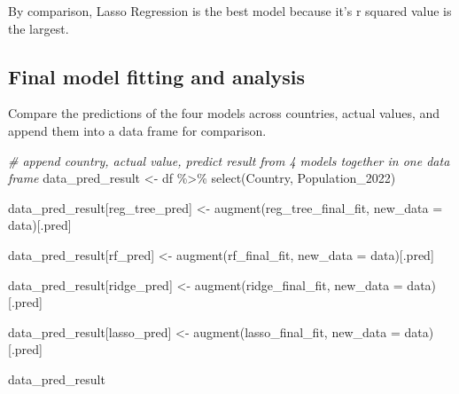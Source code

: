 \documentclass[
]{article}
\newenvironment{Shaded}{\begin{snugshade}}{\end{snugshade}}
\newcommand{\AttributeTok}[1]{\textcolor[rgb]{0.77,0.63,0.00}{#1}}
\newcommand{\CommentTok}[1]{\textcolor[rgb]{0.56,0.35,0.01}{\textit{#1}}}
\newcommand{\FunctionTok}[1]{\textcolor[rgb]{0.00,0.00,0.00}{#1}}
\newcommand{\NormalTok}[1]{#1}
\newcommand{\OtherTok}[1]{\textcolor[rgb]{0.56,0.35,0.01}{#1}}
\newcommand{\SpecialCharTok}[1]{\textcolor[rgb]{0.00,0.00,0.00}{#1}}
\newcommand{\StringTok}[1]{\textcolor[rgb]{0.31,0.60,0.02}{#1}}
\begin{document}
By comparison, Lasso Regression is the best model because it's r squared
value is the largest.

\hypertarget{final-model-fitting-and-analysis}{%
\subsection{Final model fitting and
analysis}\label{final-model-fitting-and-analysis}}

Compare the predictions of the four models across countries, actual
values, and append them into a data frame for comparison.

\begin{Shaded}
\begin{Highlighting}[]
\CommentTok{\# append country, actual value, predict result from 4 models together in one data frame}
\NormalTok{data\_pred\_result }\OtherTok{\textless{}{-}}\NormalTok{ df }\SpecialCharTok{\%\textgreater{}\%} \FunctionTok{select}\NormalTok{(}\StringTok{\textquotesingle{}Country\textquotesingle{}}\NormalTok{, }\StringTok{\textquotesingle{}Population\_2022\textquotesingle{}}\NormalTok{)}

\NormalTok{data\_pred\_result[}\StringTok{\textquotesingle{}reg\_tree\_pred\textquotesingle{}}\NormalTok{] }\OtherTok{\textless{}{-}} \FunctionTok{augment}\NormalTok{(reg\_tree\_final\_fit, }\AttributeTok{new\_data =}\NormalTok{ data)[}\StringTok{\textquotesingle{}.pred\textquotesingle{}}\NormalTok{]}

\NormalTok{data\_pred\_result[}\StringTok{\textquotesingle{}rf\_pred\textquotesingle{}}\NormalTok{] }\OtherTok{\textless{}{-}} \FunctionTok{augment}\NormalTok{(rf\_final\_fit, }\AttributeTok{new\_data =}\NormalTok{ data)[}\StringTok{\textquotesingle{}.pred\textquotesingle{}}\NormalTok{]}

\NormalTok{data\_pred\_result[}\StringTok{\textquotesingle{}ridge\_pred\textquotesingle{}}\NormalTok{] }\OtherTok{\textless{}{-}} \FunctionTok{augment}\NormalTok{(ridge\_final\_fit, }\AttributeTok{new\_data =}\NormalTok{ data)[}\StringTok{\textquotesingle{}.pred\textquotesingle{}}\NormalTok{]}

\NormalTok{data\_pred\_result[}\StringTok{\textquotesingle{}lasso\_pred\textquotesingle{}}\NormalTok{] }\OtherTok{\textless{}{-}} \FunctionTok{augment}\NormalTok{(lasso\_final\_fit, }\AttributeTok{new\_data =}\NormalTok{ data)[}\StringTok{\textquotesingle{}.pred\textquotesingle{}}\NormalTok{]}

\NormalTok{data\_pred\_result}
\end{Highlighting}
\end{Shaded}
\end{document}
